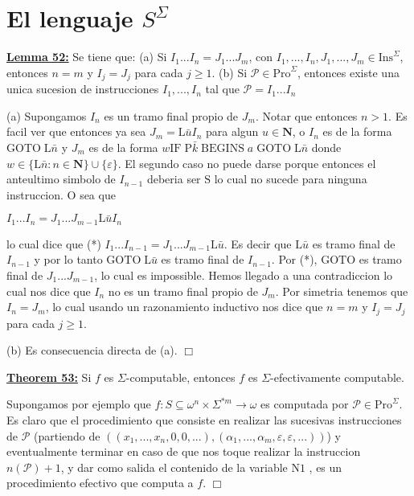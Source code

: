 \section{El lenguaje ${S}^{\Sigma}$}

\textbf{\underline{Lemma 52:}} Se tiene que:
(a) Si \(I_{1}...I_{n}=J_{1}...J_{m}\), con \( I_{1},...,I_{n},J_{1},...,J_{m}\in \mathrm{Ins}^{\Sigma }\), entonces \(n=m\) y \(I_{j}=J_{j}\) para cada \(j\geq 1\).
(b) Si \(\mathcal{P}\in \mathrm{Pro}^{\Sigma }\), entonces existe una unica sucesion de instrucciones \(I_{1},...,I_{n}\) tal que \(\mathcal{P} =I_{1}...I_{n}\)


\PROOF (a) Supongamos \(I_{n}\) es un tramo final propio de \(J_{m}.\) Notar que entonces \(n >1\). Es facil ver que entonces ya sea \(J_{m}=\mathrm{L}\bar{u} I_{n}\) para algun \(u\in \mathbf{N}\), o \(I_{n}\) es de la forma \(\mathrm{GOTO} \;\mathrm{L}\bar{n}\) y \(J_{m}\) es de la forma \(w\mathrm{IF}\;\mathrm{P}\bar{k }\;\mathrm{BEGINS}\;a\;\mathrm{GOTO}\;\mathrm{L}\bar{n}\) donde \(w\in \{ \mathrm{L}\bar{n}:n\in \mathbf{N}\}\cup \{\varepsilon \}\). El segundo caso no puede darse porque entonces el anteultimo simbolo de \(I_{n-1}\) deberia ser \(\mathrm{S}\) lo cual no sucede para ninguna instruccion. O sea que

\(\displaystyle I_{1}...I_{n}=J_{1}...J_{m-1}\mathrm{L}\bar{u}I_{n} \)

lo cual dice que
(*) \(I_{1}...I_{n-1}=J_{1}...J_{m-1}\mathrm{L}\bar{u}.\)
Es decir que \(\mathrm{L}\bar{u}\) es tramo final de \(I_{n-1}\) y por lo tanto \(\mathrm{GOTO}\;\mathrm{L}\bar{u}\) es tramo final de \(I_{n-1}.\) Por (*), \(\mathrm{GOTO}\) es tramo final de \(J_{1}...J_{m-1}\), lo cual es impossible. Hemos llegado a una contradiccion lo cual nos dice que \(I_{n}\) no es un tramo final propio de \(J_{m}.\) Por simetria tenemos que \( I_{n}=J_{m} \), lo cual usando un razonamiento inductivo nos dice que \(n=m\) y \(I_{j}=J_{j} \) para cada \(j\geq 1\).

(b) Es consecuencia directa de (a). \(\Box\)


\textbf{\underline{Theorem 53:}} Si \(f\) es \(\Sigma \)-computable, entonces \(f\) es \(\Sigma \)-efectivamente computable.


\PROOF Supongamos por ejemplo que \(f:S\subseteq \omega ^{n}\times \Sigma ^{\ast m}\rightarrow \omega \) es computada por \(\mathcal{P}\in \mathrm{Pro}^{\Sigma }\). Es claro que el procedimiento que consiste en realizar las sucesivas instrucciones de \(\mathcal{P}\) (partiendo de \(((x_{1},...,x_{n},0,0,...),( \alpha _{1},...,\alpha _{m},\varepsilon ,\varepsilon ,...))\)) y eventualmente terminar en caso de que nos toque realizar la instruccion \(n( \mathcal{P})+1\), y dar como salida el contenido de la variable \(\mathrm{N}1\) , es un procedimiento efectivo que computa a \(f\). \(\Box\)


